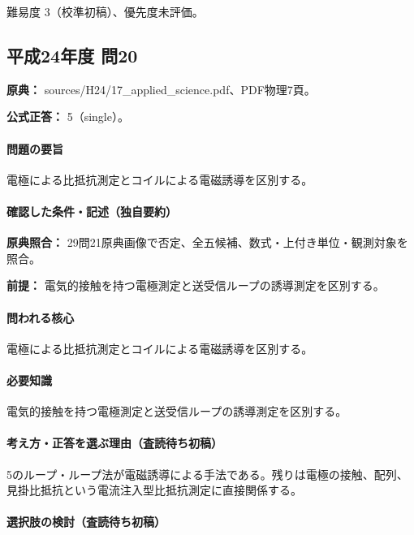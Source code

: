\par 難易度 3（校準初稿）、優先度未評価。

\subsection{平成24年度 問20}
\label{q:h24-reg-applied-20}

\noindent\textbf{原典：} sources/H24/17\_applied\_science.pdf、PDF物理7頁。

\textbf{公式正答：} 5（single）。

\paragraph{問題の要旨} 電極による比抵抗測定とコイルによる電磁誘導を区別する。

\paragraph{確認した条件・記述（独自要約）}\mbox{}\par

\noindent\textbf{原典照合：} 29問21原典画像で否定、全五候補、数式・上付き単位・観測対象を照合。\par

\noindent\textbf{前提：} 電気的接触を持つ電極測定と送受信ループの誘導測定を区別する。\par

\paragraph{問われる核心} 電極による比抵抗測定とコイルによる電磁誘導を区別する。

\paragraph{必要知識} 電気的接触を持つ電極測定と送受信ループの誘導測定を区別する。

\paragraph{考え方・正答を選ぶ理由（査読待ち初稿）} 5のループ・ループ法が電磁誘導による手法である。残りは電極の接触、配列、見掛比抵抗という電流注入型比抵抗測定に直接関係する。

\paragraph{選択肢の検討（査読待ち初稿）}\mbox{}\par

